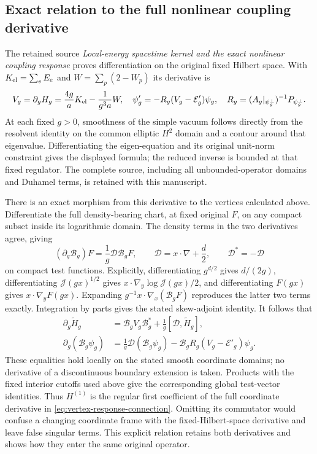 \subsection{Exact relation to the full nonlinear coupling derivative}

The retained source \emph{Local-energy spacetime kernel and the exact
nonlinear coupling response} proves differentiation on the original
fixed Hilbert space. With $K_{\rm el}=\sum_eE_e$ and
$W=\sum_p(2-W_p)$ its derivative is
\[
 V_g=\partial_gH_g=\frac{4g}{a}K_{\rm el}-\frac1{g^3a}W,
 \quad \psi'_g=-R_g(V_g-\mathcal E'_g)\psi_g,
 \quad R_g=(A_g|_{\psi_g^\perp})^{-1}P_{\psi_g^\perp}.
\]
At each fixed $g>0$, smoothness of the simple vacuum follows directly
from the resolvent identity on the common elliptic $H^2$ domain and
a contour around that eigenvalue. Differentiating the eigen-equation
and its original unit-norm constraint gives the displayed formula;
the reduced inverse is bounded at that fixed regulator. The complete
source, including all unbounded-operator domains and Duhamel terms,
is retained with this manuscript.

There is an exact morphism from this derivative to the vertices
calculated above. Differentiate the full density-bearing chart, at
fixed original $F$, on any compact subset inside its logarithmic
domain. The density terms in the two derivatives agree, giving
\begin{equation}\label{eq:vertex-chart-connection}
 (\partial_g\mathcal B_g)F=\frac1g\mathcal D\mathcal B_gF,
 \qquad \mathcal D=x\cdot\nabla+\frac d2,
 \qquad \mathcal D^*=-\mathcal D
\end{equation}
on compact test functions. Explicitly, differentiating $g^{d/2}$
gives $d/(2g)$, differentiating $\mathcal J(gx)^{1/2}$ gives
$x\cdot\nabla_y\log\mathcal J(gx)/2$, and differentiating
$F(gx)$ gives $x\cdot\nabla_yF(gx)$. Expanding
$g^{-1}x\cdot\nabla_x(\mathcal B_gF)$ reproduces the latter two
terms exactly. Integration by parts gives the stated skew-adjoint
identity. It follows that
\begin{align}
 \partial_g\widetilde H_g
   &=\mathcal B_g V_g\mathcal B_g^*
                         +\frac1g[\mathcal D,\widetilde H_g],
       \label{eq:vertex-response-connection}\\
 \partial_g(\mathcal B_g\psi_g)
   &=\frac1g\mathcal D(\mathcal B_g\psi_g)
                 -\mathcal B_gR_g(V_g-\mathcal E'_g)\psi_g.
       \nonumber
\end{align}
These equalities hold locally on the stated smooth coordinate
domains; no derivative of a discontinuous boundary extension is
taken. Products with the fixed interior cutoffs used above give
the corresponding global test-vector identities.
Thus $H^{(1)}$ is the regular first coefficient of the full
coordinate derivative in \eqref{eq:vertex-response-connection}.
Omitting its commutator would confuse a changing coordinate frame
with the fixed-Hilbert-space derivative and leave false singular
terms. This explicit relation retains both derivatives and shows
how they enter the same original operator.

